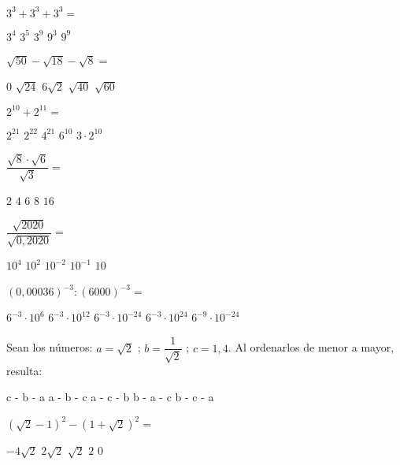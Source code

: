 \documentclass[pagina vacia]{srs}
\begin{document}
\begin{preguntas}
\pregunta \(3^3 + 3^3 + 3^3 =\)
\begin{vertical}
\alternativa \(3^4\)
\alternativa \(3^5\)
\alternativa \(3^9\)
\alternativa \(9^3\)
\alternativa \(9^9\)
\end{vertical}

\pregunta \(\sqrt{50} - \sqrt{18} - \sqrt{8} =\)
\begin{vertical}
\alternativa \(0\)
\alternativa \(\sqrt{24}\)
\alternativa \(6\sqrt{2}\)
\alternativa \(\sqrt{40}\)
\alternativa \(\sqrt{60}\)
\end{vertical}

\pregunta \(2^{10} + 2^{11} =\)
\begin{vertical}
\alternativa \(2^{21}\)
\alternativa \(2^{22}\)
\alternativa \(4^{21}\)
\alternativa \(6^{10}\)
\alternativa \(3 \cdot 2^{10}\)
\end{vertical}

\pregunta \(\dfrac{\sqrt{8} \cdot \sqrt{6}}{\sqrt{3}} =\)
\begin{vertical}
\alternativa \(2\)
\alternativa \(4\)
\alternativa \(6\)
\alternativa \(8\)
\alternativa \(16\)
\end{vertical}

\pregunta \(\dfrac{\sqrt{2020}}{\sqrt{0,2020}} =\)
\begin{vertical}
\alternativa \(10^4\)
\alternativa \(10^2\)
\alternativa \(10^{-2}\)
\alternativa \(10^{-1}\)
\alternativa \(10\)
\end{vertical}

\pregunta \((0,00036)^{-3} : (6000)^{-3} =\)
\begin{vertical}
\alternativa \(6^{-3} \cdot 10^6\)
\alternativa \(6^{-3} \cdot 10^{12}\)
\alternativa \(6^{-3} \cdot 10^{-24}\)
\alternativa \(6^{-3} \cdot 10^{24}\)
\alternativa \(6^{-9} \cdot 10^{-24}\)
\end{vertical}

\pregunta Sean los números: \(a = \sqrt{2}\) ; \(b = \dfrac{1}{\sqrt{2}}\) ; \(c = 1,4\).
Al ordenarlos de menor a mayor, resulta:
\begin{vertical}
\alternativa c - b - a
\alternativa a - b - c
\alternativa a - c - b
\alternativa b - a - c
\alternativa b - c - a
\end{vertical}

\pregunta \((\sqrt{2} - 1)^2 - (1 + \sqrt{2})^2 =\)
\begin{vertical}
\alternativa \(-4\sqrt{2}\)
\alternativa \(2\sqrt{2}\)
\alternativa \(\sqrt{2}\)
\alternativa \(2\)
\alternativa \(0\)
\end{vertical}


\end{preguntas}
\end{document}
